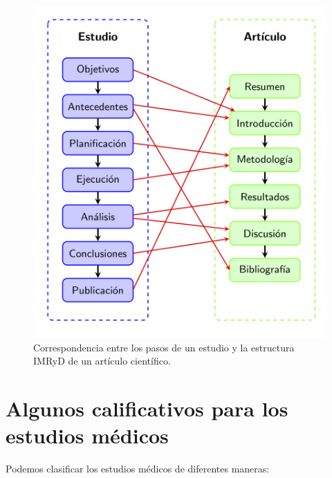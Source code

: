 \documentclass[
]{book}
\theoremstyle{definition}
\theoremstyle{definition}
\theoremstyle{definition}
\theoremstyle{definition}
\theoremstyle{remark}
\begin{document}
\begin{figure}

{\centering \includegraphics[width=0.8\linewidth]{INREMDN_files/figure-html/pasosvsarticle} 

}

\caption{Correspondencia entre los pasos de un estudio y la estructura IMRyD de un artículo científico.}\label{fig:pasosvsarticle}
\end{figure}

\hypertarget{algunos-calificativos-para-los-estudios-muxe9dicos}{%
\section{Algunos calificativos para los estudios médicos}\label{algunos-calificativos-para-los-estudios-muxe9dicos}}

Podemos clasificar los estudios médicos de diferentes maneras:
\end{document}
